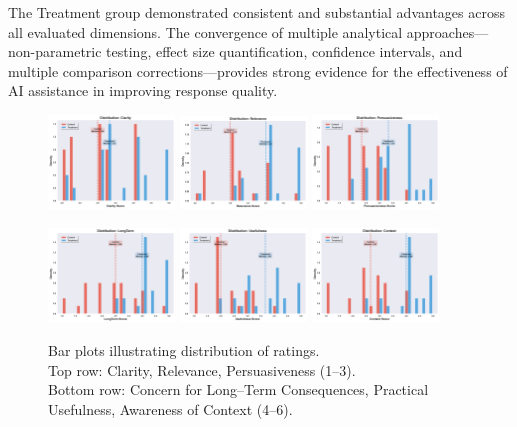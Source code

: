The Treatment group demonstrated consistent and substantial advantages across all evaluated dimensions. The convergence of multiple analytical approaches—non-parametric testing, effect size quantification, confidence intervals, and multiple comparison corrections—provides strong evidence for the effectiveness of AI assistance in improving response quality.
\begin{figure}[t]
  \centering
  \includegraphics[width=0.3\textwidth]{plots/distribution_clarity.png} \hfill
  \includegraphics[width=0.3\textwidth]{plots/distribution_relevance.png} \hfill
  \includegraphics[width=0.3\textwidth]{plots/distribution_persuasiveness.png}

  \vspace{1em} %

  \includegraphics[width=0.3\textwidth]{plots/distribution_longterm.png} \hfill
  \includegraphics[width=0.3\textwidth]{plots/distribution_usefulness.png} \hfill
  \includegraphics[width=0.3\textwidth]{plots/distribution_context.png}

  \caption{
    Bar plots illustrating distribution of ratings.\\
    Top row: Clarity, Relevance, Persuasiveness (1–3).\\
    Bottom row: Concern for Long--Term Consequences, Practical Usefulness, Awareness of Context (4–6).
  }
  \label{fig:Distribution of Ratings per Dimension}
\end{figure}
